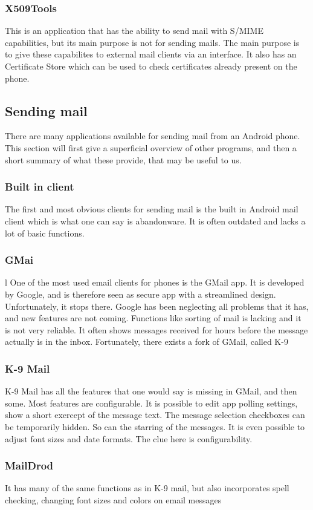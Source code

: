 \subsubsection{X509Tools}
This is an application that has the ability to send mail with S/MIME capabilities, but its main purpose is not for sending mails. The main purpose is to give these capabilites to external mail clients via an interface. It also has an Certificate Store which can be used to check certificates already present on the phone. 

\subsection{Sending mail}
There are many applications available for sending mail from an Android phone. This section will first give a superficial overview of other programs, and then a short summary of what these provide, that may be useful to us.

\subsubsection{Built in client}
The first and most obvious clients for sending mail is the built in Android mail client which is what one can say is abandonware. It is often outdated and lacks a lot of basic functions.

\subsubsection{GMai}l
One of the most used email clients for phones is the GMail app. It is developed by Google, and is therefore seen as secure app with a streamlined design. Unfortunately, it stops there. Google has been neglecting all problems that it has, and new features are not coming. Functions like sorting of mail is lacking and it is not very reliable. It often shows messages received for hours before the message actually is in the inbox. Fortunately, there exists a fork of GMail, called K-9

\subsubsection{K-9 Mail}
K-9 Mail has all the features that one would say is missing in GMail, and then some. Most features are configurable. It is possible to edit app polling settings, show a short exercept of the message text. The message selection checkboxes can be temporarily hidden. So can the starring of the messages. It is even possible to adjust font sizes and date formats. The clue here is configurability.

\subsubsection{MailDrod}
It has many of the same functions as in K-9 mail, but also incorporates spell checking, changing font sizes and colors on email messages